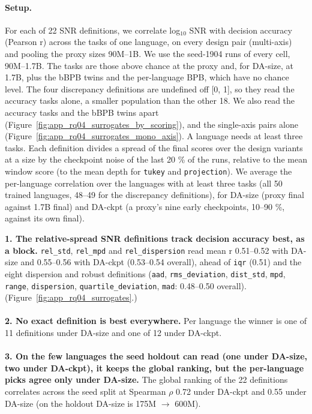 {\begin{minipage}[t]{0.485\textwidth}
\paragraph{Setup.} For each of 22 SNR definitions, we correlate log$_{10}$ SNR with decision accuracy (Pearson r) across the tasks of one language, on every design pair (multi-axis) and pooling the proxy sizes 90M--1B. We use the seed-1904 runs of every cell, 90M--1.7B. The tasks are those above chance at the proxy and, for DA-size, at 1.7B, plus the bBPB twins and the per-language BPB, which have no chance level. The four discrepancy definitions are undefined off [0, 1], so they read the accuracy tasks alone, a smaller population than the other 18. We also read the accuracy tasks and the bBPB twins apart (Figure~\ref{fig:app_rq04_surrogates_by_scoring}), and the single-axis pairs alone (Figure~\ref{fig:app_rq04_surrogates_mono_axis}). A language needs at least three tasks. Each definition divides a spread of the final scores over the design variants at a size by the checkpoint noise of the last 20 \% of the runs, relative to the mean window score (to the mean depth for \texttt{tukey} and \texttt{projection}). We average the per-language correlation over the languages with at least three tasks (all 50 trained languages, 48--49 for the discrepancy definitions), for DA-size (proxy final against 1.7B final) and DA-ckpt (a proxy's nine early checkpoints, 10--90 \%, against its own final).
\end{minipage}\hfill
\begin{minipage}[t]{0.485\textwidth}
\vspace{0pt}
\begin{rqfinding}
\textbf{1. The relative-spread SNR definitions track decision accuracy best, as a block.} \texttt{rel\_std}, \texttt{rel\_mpd} and \texttt{rel\_dispersion} read mean r 0.51--0.52 with DA-size and 0.55--0.56 with DA-ckpt (0.53--0.54 overall), ahead of \texttt{iqr} (0.51) and the eight dispersion and robust definitions (\texttt{aad}, \texttt{rms\_deviation}, \texttt{dist\_std}, \texttt{mpd}, \texttt{range}, \texttt{dispersion}, \texttt{quartile\_deviation}, \texttt{mad}: 0.48--0.50 overall). (Figure~\ref{fig:app_rq04_surrogates}.)
\\
\\
\textbf{2. No exact definition is best everywhere.} Per language the winner is one of 11 definitions under DA-size and one of 12 under DA-ckpt.
\\
\\
\textbf{3. On the few languages the seed holdout can read (one under DA-size, two under DA-ckpt), it keeps the global ranking, but the per-language picks agree only under DA-size.} The global ranking of the 22 definitions correlates across the seed split at Spearman $\rho$ 0.72 under DA-ckpt and 0.55 under DA-size (on the holdout DA-size is 175M $\rightarrow$ 600M).
\end{rqfinding}
\end{minipage}

}
